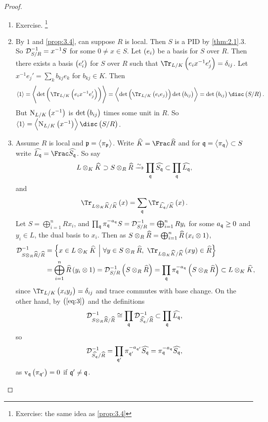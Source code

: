 \begin{proof}
\hfill
\begin{enumerate}
\item Exercise. \footnote{Exercise: the same idea as \ref{prop:3.4}}
\item By $ 1 $ and \ref{prop:3.4}, can suppose $ R $ is local. Then $ S $ is a PID by \ref{thm:2.1}.$ 3 $. So $ \mathcal{D}_{S / R}^{-1} = x^{-1}S $ for some $ 0 \ne x \in S $. Let $ \br{e_i} $ be a basis for $ S $ over $ R $. Then there exists a basis $ \br{e_i'} $ for $ S $ over $ R $ such that $ \Tr_{L / K}\br{e_ix^{-1}e_j'} = \delta_{ij} $. Let $ x^{-1}e_j' = \sum_k b_{kj}e_k $ for $ b_{kj} \in K $. Then
$$ \abr{1} = \abr{\det \br{\Tr_{L / K}\br{e_ix^{-1}e_j'}}} = \abr{\det \br{\Tr_{L / K}\br{e_ie_j}}\det \br{b_{ij}}} = \det \br{b_{ij}}\disc\br{S / R}. $$
But $ \N_{L / K}\br{x^{-1}} $ is $ \det \br{b_{ij}} $ times some unit in $ R $. So $ \abr{1} = \abr{\N_{L / K}\br{x^{-1}}}\disc\br{S / R} $.


\item Assume $ R $ is local and $ \mathfrak{p} = \left\langle \pi_{\mathfrak{p}} \right\rangle $. Write $ \widehat{K} = \Frac \widehat{R} $ and for $ \mathfrak{q} = \left\langle \pi_{\mathfrak{q}} \right\rangle \subset S $ write $ \widehat{L_\qqq} = \Frac \widehat{S_\qqq} $. So say
$$ L \otimes_K \widehat{K} \supset S \otimes_R \widehat{R} \xrightarrow{\sim} \prod_{\mathfrak{q}} \widehat{S_{\mathfrak{q}}} \subset \prod_{\mathfrak{q}} \widehat{L_{\mathfrak{q}}}, $$
and
\begin{equation}
\label{eq:3}
\Tr_{L \otimes_K \widehat{K} / \widehat{K}}\br{x} = \sum_\qqq \Tr_{\widehat{L_\qqq} / \widehat{K}}\br{x}.
\end{equation}
Let $ S = \bigoplus_{i = 1}^n Rx_i $, and $ \prod_{\mathfrak{q}} \pi_{\mathfrak{q}}^{-a_{\mathfrak{q}}}S = \mathcal{D}_{S / R}^{-1} = \bigoplus_{i = 1}^n Ry_i $ for some $ a_{\mathfrak{q}} \ge 0 $ and $ y_i \in L $, the dual basis to $ x_i $. Then as $ S \otimes_R \widehat{R} = \bigoplus_{i = 1}^n \widehat{R}\br{x_i \otimes 1} $,
\begin{align*}
\DDD_{S \otimes_R \widehat{R} / \widehat{R}}^{-1}
& = \cbr{x \in L \otimes_K \widehat{K} \st \forall y \in S \otimes_R \widehat{R}, \ \Tr_{L \otimes_K \widehat{K} / \widehat{K}}\br{xy} \in \widehat{R}} \\
& = \bigoplus_{i = 1}^n \widehat{R}\br{y_i \otimes 1}
= \DDD_{S / R}^{-1}\br{S \otimes_R \widehat{R}}
= \prod_\qqq \pi_\qqq^{-a_\qqq}\br{S \otimes_R \widehat{R}}
\subset L \otimes_K \widehat{K},
\end{align*}
since $ \Tr_{L / K}\br{x_iy_j} = \delta_{ij} $ and trace commutes with base change. On the other hand, by $ \br{\ref{eq:3}} $ and the definitions
$$ \mathcal{D}_{S \otimes_R \widehat{R} / \widehat{R}}^{-1} \cong \prod_{\mathfrak{q}} \mathcal{D}_{\widehat{S_{\mathfrak{q}}} / \widehat{R}}^{-1} \subset \prod_{\mathfrak{q}} \widehat{L_{\mathfrak{q}}}, $$
so
$$ \mathcal{D}_{\widehat{S_{\mathfrak{q}}} / \widehat{R}}^{-1} = \prod_{\mathfrak{q}'} \pi_{\mathfrak{q}'}^{-a_{\mathfrak{q}'}}\widehat{S_{\mathfrak{q}}} = \pi_{\mathfrak{q}}^{-a_{\mathfrak{q}}}\widehat{S_{\mathfrak{q}}}, $$
as $ \v_\qqq\br{\pi_{\qqq'}} = 0 $ if $ \mathfrak{q}' \ne \mathfrak{q} $.
\end{enumerate}
\end{proof}

